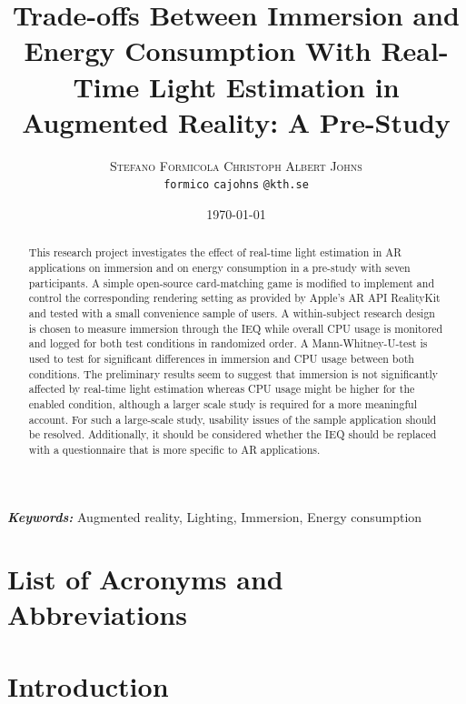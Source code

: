 \documentclass[12pt,twoside,english]{article}
\title{Trade-offs Between Immersion and Energy Consumption With Real-Time Light Estimation in Augmented Reality: A Pre-Study}
\author{
        \textsc{Stefano Formicola}
            \qquad
        \textsc{Christoph Albert Johns}
        \mbox{}\\
        \normalsize
            \texttt{formico}
        \textbar{}
            \texttt{cajohns}
        \normalsize
            \texttt{@kth.se}
}
\date{\today}
\providecommand{\keywords}[1]
{
  \small	
  \textbf{\textit{Keywords:}} #1
}
\begin{document}
\maketitle


\begin{abstract}
\label{sec:abstract}

This research project investigates the effect of real-time light estimation in \gls{AR} applications on immersion and on energy consumption in a pre-study with seven participants.
A simple open-source card-matching game is modified to implement and control the corresponding rendering setting as provided by Apple's \gls{AR} \gls{API} RealityKit and tested with a small convenience sample of users.
A within-subject research design is chosen to measure immersion through the \gls{IEQ} while overall \gls{CPU} usage is monitored and logged for both test conditions in randomized order.
A Mann-Whitney-U-test is used to test for significant differences in immersion and \gls{CPU} usage between both conditions.
The preliminary results seem to suggest that immersion is not significantly affected by real-time light estimation whereas \gls{CPU} usage might be higher for the enabled condition, although a larger scale study is required for a more meaningful account.
For such a large-scale study, usability issues of the sample application should be resolved.
Additionally, it should be considered whether the \gls{IEQ} should be replaced with a questionnaire that is more specific to \gls{AR} applications.

\end{abstract}

\keywords{Augmented reality, Lighting, Immersion, Energy consumption}
\clearpage

\tableofcontents

\section*{List of Acronyms and Abbreviations}
\label{list-of-acronyms-and-abbreviations}
\renewcommand{\glossarysection}[2][]{} %
\printglossary[type=\acronymtype, nonumberlist]

\clearpage
\section{Introduction}
\label{sect:introduction}
\end{document}
